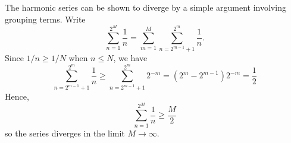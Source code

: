 \documentclass[12pt]{article}
\begin{document}
The harmonic series can be shown to diverge by a simple argument involving grouping terms.  Write
 \[ \sum_{n=1}^{2^M} \frac{1}{n} = \sum_{m=1}^M \sum_{n=2^{m-1}+1}^{2^m} \frac{1}{n}. \]
Since $1/n \ge 1/N$ when $n \le N$, we have
 \[ \sum_{n=2^{m-1}+1}^{2^m} \frac{1}{n} \ge \sum_{n=2^{m-1}+1}^{2^m} 2^{-m} = (2^m - 2^{m-1}) 2^{-m} = \frac{1}{2} \]
Hence,
 \[ \sum_{n=1}^{2^M} \frac{1}{n} \ge \frac{M}{2} \]
so the series diverges in the limit $M \to \infty$.
\end{document}
